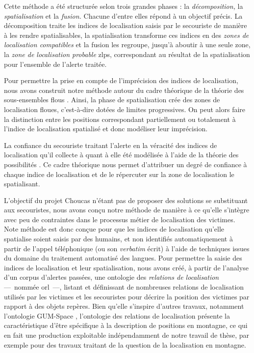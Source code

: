 Cette méthode a été structurée selon trois grandes phases : la
\emph{décomposition,} la \emph{spatialisation} et la \emph{fusion.}
Chacune d'entre elles répond à un objectif précis. La décomposition
traite les indices de localisation saisis par le secouriste de manière
à les rendre spatialisables, la spatialisation transforme ces indices
en des \emph{zones de localisation compatibles} et la fusion les
regroupe, jusqu'à aboutir à une seule zone, la \emph{zone de
  localisation probable} \acp{zlp}, correspondant au résultat de la
spatialisation pour l'ensemble de l'alerte traitée.

Pour permettre la prise en compte de l'imprécision des indices de
localisation, nous avons construit notre méthode autour du cadre
théorique de la théorie des sous-ensembles flous
\autocite{Zadeh1965}. Ainsi, la phase de spatialisation crée des zones
de localisation floues, c'est-à-dire dotées de limites
progressives. On peut alors faire la distinction entre les positions
correspondant partiellement ou totalement à l'indice de localisation
spatialisé et donc modéliser leur imprécision. 

La confiance du secouriste traitant l'alerte en la véracité des
indices de localisation qu'il collecte à quant à elle été modélisée à
l'aide de la théorie des possibilités \autocite{Zadeh1978}. Ce cadre
théorique nous permet d'attribuer un degré de confiance à chaque
indice de localisation et de le répercuter sur la zone de localisation
le spatialisant.

L'objectif du projet Choucas n'étant pas de proposer des solutions se
substituant aux secouristes, nous avons conçu notre méthode de manière
à ce qu'elle s'intègre avec peu de contraintes dans le processus
métier de localisation des victimes. Note méthode est donc conçue pour
que les indices de localisation qu'elle spatialise soient saisis par
des humains, et non identifiés automatiquement à partir de l'appel
téléphonique (ou son \emph{verbatim} écrit) à l'aide de techniques
issues du domaine du traitement automatisé des langues. Pour permettre
la saisie des indices de localisation et leur spatialisation, nous
avons créé, à partir de l'analyse d'un corpus d'alertes passées, une
ontologie des \emph{relations de localisation} ---~nommée
\ac{orl}~---, listant et définissant de nombreuses relations de
localisation utilisés par les victimes et les secouristes pour décrire
la position des victimes par rapport à des objets repères. Bien
qu'elle s'inspire d'autres travaux, notamment l'ontologie GUM-Space
\autocite{Bateman2010}, l'ontologie des relations de localisation
présente la caractéristique d'être spécifique à la description de
positions en montagne, ce qui en fait une production exploitable
indépendamment de notre travail de thèse, par exemple pour des travaux
traitant de la question de la localisation en montagne.

